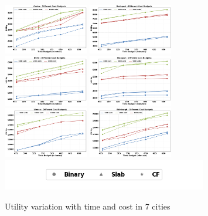 \begin{figure}[htbp]
    \centering
    \includegraphics[width=0.33\textwidth]{plots/exp1-osaka_pkj.png}
    \includegraphics[width=0.33\textwidth]{plots/exp1-budapest_pkj.png}
    \includegraphics[width=0.33\textwidth]{plots/exp1-delhi_pkj.png}
    \includegraphics[width=0.33\textwidth]{plots/exp1-glasgow_pkj.png}
    \includegraphics[width=0.33\textwidth]{plots/exp1-vienna_pkj.png}
    \includegraphics[width=0.33\textwidth]{plots/exp1-edinburgh_pkj.png}
    \includegraphics[width=0.8\textwidth]{plots/legend_pkj.png}
    \caption{Utility variation with time and cost in 7 cities}
    \label{fig:cities}
\end{figure}

